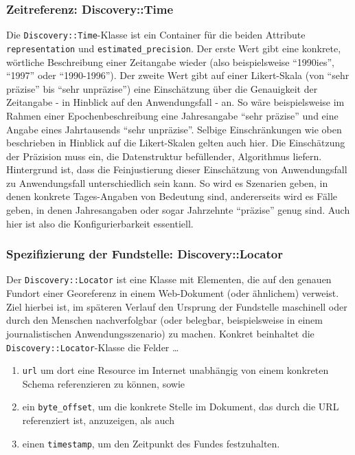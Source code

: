 \subsubsection{Zeitreferenz: Discovery::Time}
Die \texttt{Discovery::Time}-Klasse ist ein Container für die beiden Attribute \texttt{representation} und \texttt{estimated\_precision}. Der erste Wert gibt eine konkrete, wörtliche Beschreibung einer Zeitangabe wieder (also beispielsweise ``1990ies'', ``1997'' oder ``1990-1996''). Der zweite Wert gibt auf einer Likert-Skala (von ``sehr präzise'' bis ``sehr unpräzise'') eine Einschätzung über die Genauigkeit der Zeitangabe - in Hinblick auf den Anwendungsfall - an. So wäre beispielsweise im Rahmen einer Epochenbeschreibung eine Jahresangabe ``sehr präzise'' und eine Angabe eines Jahrtausends ``sehr unpräzise''. Selbige Einschränkungen wie oben beschrieben in Hinblick auf die Likert-Skalen gelten auch hier. Die Einschätzung der Präzision muss ein, die Datenstruktur befüllender, Algorithmus liefern. Hintergrund ist, dass die Feinjustierung dieser Einschätzung von Anwendungsfall zu Anwendungsfall unterschiedlich sein kann. So wird es Szenarien geben, in denen konkrete Tages-Angaben von Bedeutung sind, andererseits wird es Fälle geben, in denen Jahresangaben oder sogar Jahrzehnte ``präzise'' genug sind. Auch hier ist also die Konfigurierbarkeit essentiell.

\subsubsection{Spezifizierung der Fundstelle: Discovery::Locator}
Der \texttt{Discovery::Locator} ist eine Klasse mit Elementen, die auf den genauen Fundort einer Georeferenz in einem Web-Dokument (oder ähnlichem) verweist. Ziel hierbei ist, im späteren Verlauf den Ursprung der Fundstelle maschinell oder durch den Menschen nachverfolgbar (oder belegbar, beispielsweise in einem journalistischen Anwendungsszenario) zu machen. Konkret beinhaltet die \texttt{Discovery::Locator}-Klasse die Felder \ldots

\begin{enumerate}
  \item{\texttt{url} um dort eine Resource im Internet unabhängig von einem konkreten Schema referenzieren zu können, sowie}
  \item{ein \texttt{byte\_offset}, um die konkrete Stelle im Dokument, das durch die URL referenziert ist, anzuzeigen, als auch}
  \item{einen \texttt{timestamp}, um den Zeitpunkt des Fundes festzuhalten.}
\end{enumerate}
  
